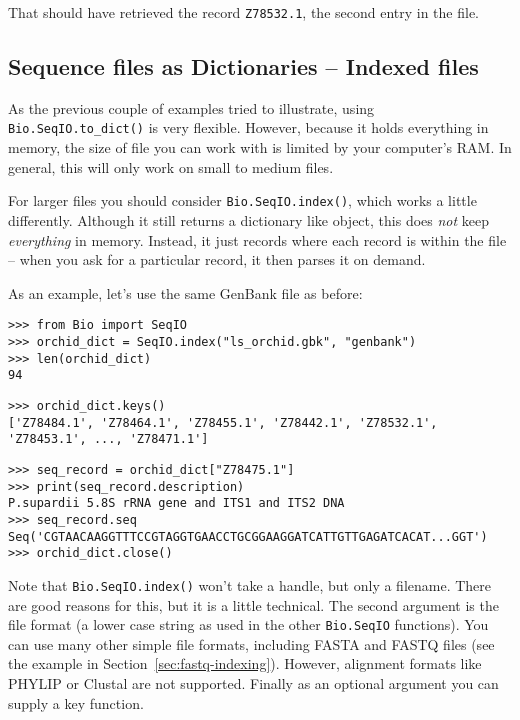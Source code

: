 \noindent That should have retrieved the record \texttt{Z78532.1}, the second entry in the file.

\subsection{Sequence files as Dictionaries -- Indexed files}
\label{sec:SeqIO-index}

As the previous couple of examples tried to illustrate, using
\verb|Bio.SeqIO.to_dict()| is very flexible. However, because it holds
everything in memory, the size of file you can work with is limited by your
computer's RAM. In general, this will only work on small to medium files.

For larger files you should consider
\verb|Bio.SeqIO.index()|, which works a little differently. Although
it still returns a dictionary like object, this does \emph{not} keep
\emph{everything} in memory. Instead, it just records where each record
is within the file -- when you ask for a particular record, it then parses
it on demand.

As an example, let's use the same GenBank file as before:

\begin{verbatim}
>>> from Bio import SeqIO
>>> orchid_dict = SeqIO.index("ls_orchid.gbk", "genbank")
>>> len(orchid_dict)
94
\end{verbatim}
\begin{verbatim}
>>> orchid_dict.keys()
['Z78484.1', 'Z78464.1', 'Z78455.1', 'Z78442.1', 'Z78532.1', 'Z78453.1', ..., 'Z78471.1']
\end{verbatim}

\begin{verbatim}
>>> seq_record = orchid_dict["Z78475.1"]
>>> print(seq_record.description)
P.supardii 5.8S rRNA gene and ITS1 and ITS2 DNA
>>> seq_record.seq
Seq('CGTAACAAGGTTTCCGTAGGTGAACCTGCGGAAGGATCATTGTTGAGATCACAT...GGT')
>>> orchid_dict.close()
\end{verbatim}

\noindent Note that \verb|Bio.SeqIO.index()| won't take a handle,
but only a filename. There are good reasons for this, but it is a little
technical. The second argument is the file format (a lower case string as
used in the other \verb|Bio.SeqIO| functions). You can use many other
simple file formats, including FASTA and FASTQ files (see the example in
Section~\ref{sec:fastq-indexing}). However, alignment
formats like PHYLIP or Clustal are not supported. Finally as an optional
argument you can supply a key function.

